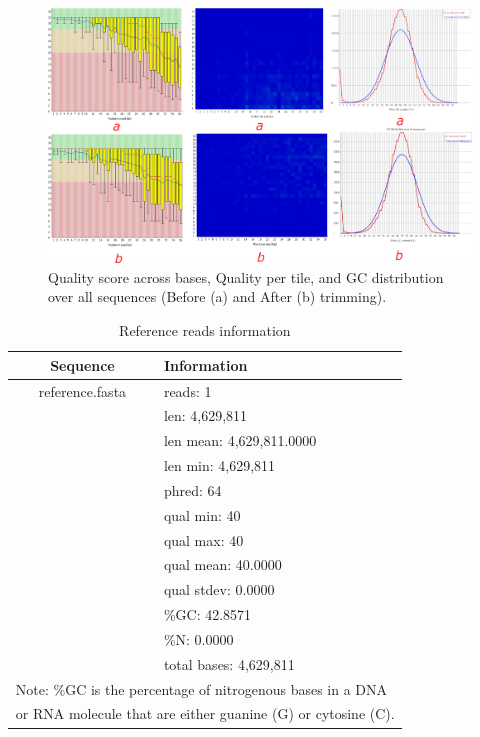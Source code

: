\documentclass[conference]{IEEEtran}
\begin{document}
\begin{figure}[htbp]
	\centerline{\includegraphics[scale = 0.8]{Fig1.png}}
	\caption{Quality score across bases, Quality per tile, and GC distribution over all sequences (Before (a) and After (b) trimming).}
	\label{fig}
\end{figure}
\begin{table}[htbp]
	\caption{Reference reads information}
	\begin{center}
		\begin{tabular}{|c|l|}
			\hline
			\textbf{Sequence} & \textbf{Information}\\
			\hline
			{reference.fasta}&reads: 1\\
			&len: 4,629,811\\
			&len mean: 4,629,811.0000\\
			&len min:	4,629,811\\
			&phred: 64\\
			&qual min: 40\\
			&qual max: 40\\
			&qual mean: 40.0000\\
			&qual stdev: 0.0000\\
			&\%GC: 42.8571\\
			&\%N: 0.0000\\
			&total bases: 4,629,811\\
			\hline
			\multicolumn{2}{l}{$^{\mathrm{}}$Note: \%GC is the percentage of nitrogenous bases in a DNA}\\
			\multicolumn{2}{l}{$^{\mathrm{}}$or RNA molecule that are either guanine (G) or cytosine (C).}
		\end{tabular}
	\end{center}
\end{table}
\end{document}

